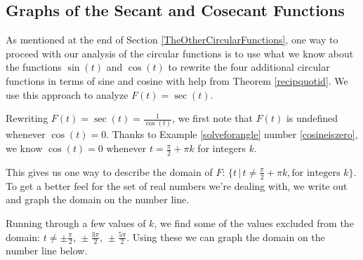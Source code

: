 

\setcounter{footnote}{0}

\label{GraphsofOtherCircularFunctions}


\subsection{Graphs of the Secant and Cosecant Functions}
\label{secantcosecantgraphsection}

As mentioned at the end of Section \ref{TheOtherCircularFunctions}, one way to proceed with our analysis of the circular functions is to use what we know about the functions $\sin(t)$ and $\cos(t)$ to rewrite the four additional circular functions in terms of sine and cosine with help from Theorem \ref{recipquotid}.  We use this approach to analyze $F(t) = \sec(t)$.

\smallskip

Rewriting $F(t) = \sec(t)= \frac{1}{\cos(t)}$, we first note that  $F(t)$ is undefined whenever $\cos(t) = 0$.  Thanks to Example \ref{solveforangle} number \ref{cosineiszero}, we know $\cos(t) = 0$ whenever $t = \frac{\pi}{2} + \pi k$ for integers $k$.

\smallskip

This gives us one way to describe the domain of $F$:  $\{ t \, | \, t \neq  \frac{\pi}{2} + \pi k, \text{for integers $k$} \}$.  To get a better feel for the set of real numbers we're dealing with, we write out and graph the domain on the number line.

\smallskip

Running through a few values of $k$, we find some of the values excluded from the domain:   $t \neq  \pm \frac{\pi}{2}, \, \pm \frac{3\pi}{2}, \, \pm \frac{5\pi}{2}$.  Using these we can graph the domain on the number line below.


